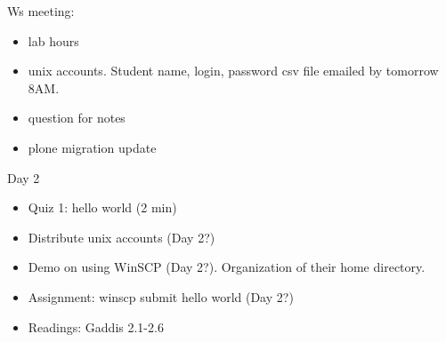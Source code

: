 \documentclass[
]{article}
\providecommand{\tightlist}{%
  \setlength{\itemsep}{0pt}\setlength{\parskip}{0pt}}
\begin{document}
Ws meeting:

\begin{itemize}
\tightlist
\item
  lab hours
\item
  unix accounts. Student name, login, password csv file emailed by
  tomorrow 8AM.
\item
  question for notes
\item
  plone migration update
\end{itemize}

Day 2

\begin{itemize}
\tightlist
\item
  Quiz 1: hello world (2 min)
\end{itemize}

\begin{itemize}
\tightlist
\item
  Distribute unix accounts (Day 2?)
\item
  Demo on using WinSCP (Day 2?). Organization of their home directory.
\item
  Assignment: winscp submit hello world (Day 2?)
\item
  Readings: Gaddis 2.1-2.6
\end{itemize}
\end{document}

